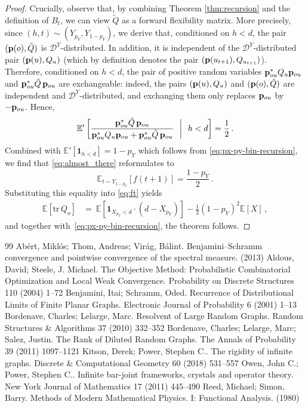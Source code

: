 \documentclass[10pt,a4paper]{amsart}
\numberwithin{equation}{section}
\newcommand{\E}{\mathbb E}
\newcommand{\cD}{\mathcal D}
\newcommand{\p}{{\bf p}}
\newcommand{\tr}{{\mathrm {tr}}}
\begin{document}
\begin{proof}
Crucially, observe that, by combining Theorem \ref{thm:recursion} and the definition of $B_t$, we can view $\tilde Q$ as a forward flexibility matrix. More precisely, since $(h,t)\sim (Y_{p_Y},Y_{1-p_Y})$, we derive that, conditioned on $h<d$, the pair $(\p(o),\tilde Q)$ is $\cD^Y$-distributed.
In addition, it is independent of the $\cD^Y$-distributed pair $(\p(u),Q_u)$ (which by definition denotes the pair $(\p(u_{t+1}),Q_{u_{t+1}})$).
Therefore, conditioned on $h<d$, the pair of positive random variables
$\p_{ou}^*Q_{u}\p_{ou}$ and 
$\p_{ou}^*\tilde Q\,\p_{ou}$
are exchangeable: indeed, the pairs \((\p(u),Q_u)\) and \((\p(o),\tilde Q)\) are independent and $\cD^Y$-distributed, and exchanging them only replaces \(\p_{ou}\) by \(-\p_{ou}\). Hence,
\[
\E'\left[ \frac{\p_{ou}^*\tilde Q\,\p_{ou}}{\p_{ou}^*Q_{u}\p_{ou}+\p_{ou}^*\tilde Q\,\p_{ou}} ~~\middle |~~ h<d \right]=\frac{1}{2}\,.
\]
Combined with $\E'[\mathbf 1_{h<d}]=1-p_Y$ which follows from \eqref{eq:px-py-bin-recursion}, we find that \eqref{eq:almost_there} reformulates to
\[
\E_{t\sim Y_{1-p_Y}}[f(t+1)]=\frac{1-p_Y}{2}\,.
\]
Substituting this equality into \eqref{eq:ft} yields
\begin{align*}
    \E[\tr\,Q_o]
    &=~
\E[\mathbf 1_{X_{p_Y}<d}\cdot(d-X_{p_Y})] - \frac12(1-p_Y)^2\E[X]\,,
\end{align*}
and together with~\eqref{eq:px-py-bin-recursion}, the theorem follows.

\end{proof}

\begin{thebibliography}{99}
 Ab{\'e}rt, Mikl{\'o}s; Thom, Andreas; Vir{\'a}g, B{\'a}lint. Benjamini--Schramm convergence and pointwise convergence of the spectral measure. (2013)
 Aldous, David; Steele, J. Michael. The Objective Method: Probabilistic Combinatorial Optimization and Local Weak Convergence. Probability on Discrete Structures 110 (2004) 1--72
 Benjamini, Itai; Schramm, Oded. Recurrence of Distributional Limits of Finite Planar Graphs. Electronic Journal of Probability 6 (2001) 1--13
 Bordenave, Charles; Lelarge, Marc. Resolvent of Large Random Graphs. Random Structures \& Algorithms 37 (2010) 332--352
 Bordenave, Charles; Lelarge, Marc; Salez, Justin. The Rank of Diluted Random Graphs. The Annals of Probability 39 (2011) 1097--1121
 Kitson, Derek; Power, Stephen C.. The rigidity of infinite graphs. Discrete \& Computational Geometry 60 (2018) 531--557
 Owen, John C.; Power, Stephen C.. Infinite bar-joint frameworks, crystals and operator theory. New York Journal of Mathematics 17 (2011) 445--490
 Reed, Michael; Simon, Barry. Methods of Modern Mathematical Physics. {I}: Functional Analysis. (1980)
\end{thebibliography}
\end{document}
